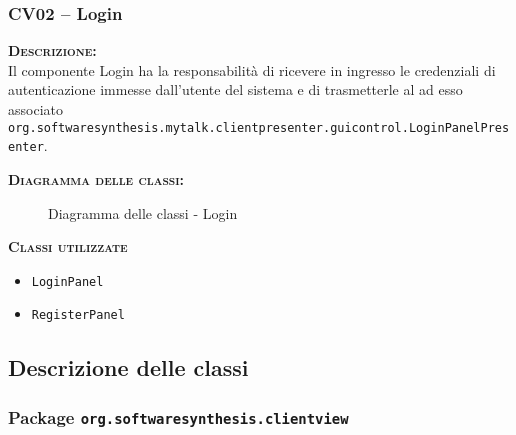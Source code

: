 \subsubsection{CV02 -- Login}\label{sec:cv02}
\begin{description}
  \item{\scshape\bfseries Descrizione:}\\
Il componente \textsf{Login} ha la responsabilità di ricevere in ingresso le credenziali di autenticazione immesse dall'utente del sistema e di trasmetterle al  ad esso associato \texttt{org.softwaresynthesis.mytalk.clientpresenter.guicontrol.LoginPanelPresenter}.

	\item{\scshape\bfseries Diagramma delle classi:}
  \begin{figure}[H]
    \centering
    \caption{Diagramma delle classi - Login}\label{fig:login}
  \end{figure}

  \item{\scshape\bfseries Classi utilizzate}
  \begin{itemize}[noitemsep,nolistsep]
    \item \texttt{LoginPanel}
    \item \texttt{RegisterPanel}
  \end{itemize}

\end{description}

\subsection{Descrizione delle classi}

\subsubsection{Package \texttt{org.softwaresynthesis.clientview}}

